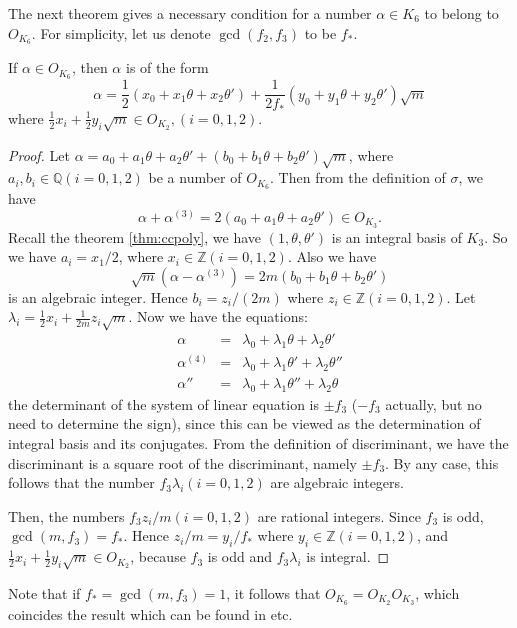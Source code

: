 The next theorem \citep{maki1980determination} gives a necessary condition for a number $\alpha\in K_6$ to belong to $O_{K_6}$. For simplicity, let us denote $\operatorname{gcd}(f_2,f_3)$ to be $f_*$.
\begin{lemma} \label{integersex}
If $\alpha\in O_{K_6}$, then $\alpha$ is of the form $$\alpha=\frac{1}{2}(x_0+x_1\theta+x_2\theta')+\frac{1}{2f_*}(y_0+y_1\theta+y_2\theta')\sqrt{m}$$
where $\frac{1}{2}x_i+\frac{1}{2}y_i\sqrt{m}\in O_{K_2},(i=0,1,2)$.
\begin{proof}
Let $\alpha=a_0+a_1\theta+a_2\theta'+(b_0+b_1\theta+b_2\theta')\sqrt{m}$, where $a_i,b_i\in\mathbb{Q}(i=0,1,2)$ be a number of $O_{K_6}$. Then from the definition of $\sigma$, we have $$\alpha+\alpha^{(3)}=2(a_0+a_1\theta+a_2\theta')\in O_{K_3}.$$ Recall the theorem \ref{thm:ccpoly}, we have $(1,\theta,\theta')$ is an integral basis of $K_3$. So we have $a_i=x_1/2$, where $x_i\in\mathbb{Z}(i=0,1,2)$. Also we have $$\sqrt{m}(\alpha-\alpha^{(3)})=2m(b_0+b_1\theta+b_2\theta')$$ is an algebraic integer. Hence $b_i=z_i/(2m)$ where $z_i\in\mathbb{Z}(i=0,1,2)$. Let $\lambda_i=\frac{1}{2}x_i+\frac{1}{2m}z_i\sqrt{m}$. Now we have the equations:
\begin{eqnarray}
\alpha&=&\lambda_0+\lambda_1\theta+\lambda_2\theta' \\
\alpha^{(4)}&=&\lambda_0+\lambda_1\theta'+\lambda_2\theta'' \\
\alpha''&=&\lambda_0+\lambda_1\theta''+\lambda_2\theta 
\end{eqnarray}
the determinant of the system of linear equation is $\pm f_3$ ($-f_3$ actually, but no need to determine the sign), since this can be viewed as the determination of integral basis and its conjugates. From the definition of discriminant, we have the discriminant is a square root of the discriminant, namely $\pm f_3$. By any case, this follows that the number $f_3\lambda_i (i=0,1,2)$ are algebraic integers. 

Then, the numbers $f_3z_i/m (i=0,1,2)$ are rational integers. Since $f_3$ is odd, $\operatorname{gcd}(m,f_3)=f_*$. Hence $z_i/m=y_i/f_*$ where $y_i\in\mathbb{Z}(i=0,1,2)$, and $\frac{1}{2}x_i+\frac{1}{2}y_i\sqrt{m}\in O_{K_2}$, because $f_3$ is odd and $f_3\lambda_i$ is integral.
\end{proof}
\end{lemma}
Note that if $f_*=\operatorname{gcd}(m,f_3)=1$, it follows that $O_{K_6}=O_{K_2}O_{K_3}$, which coincides the result which can be found in \citep{Xianke2006ANT,cohen1993course} etc. 

